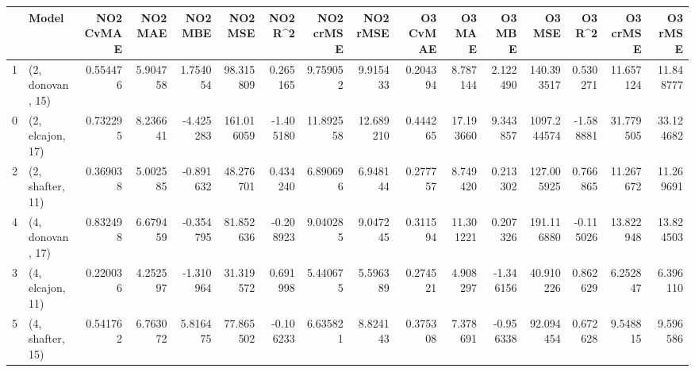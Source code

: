 \begin{tabular}{llrrrrrrrrrrrrrr}
\toprule
{} &             Model &  NO2 CvMAE &   NO2 MAE &   NO2 MBE &     NO2 MSE &   NO2 R\textasciicircum2 &  NO2 crMSE &   NO2 rMSE &  O3 CvMAE &     O3 MAE &    O3 MBE &       O3 MSE &    O3 R\textasciicircum2 &   O3 crMSE &    O3 rMSE \\
\midrule
1 &  (2, donovan, 15) &   0.554476 &  5.904758 &  1.754054 &   98.315809 &  0.265165 &   9.759052 &   9.915433 &  0.204394 &   8.787144 &  2.122490 &   140.393517 &  0.530271 &  11.657124 &  11.848777 \\
0 &  (2, elcajon, 17) &   0.732295 &  8.236641 & -4.425283 &  161.016059 & -1.405180 &  11.892558 &  12.689210 &  0.444265 &  17.193660 &  9.343857 &  1097.244574 & -1.588881 &  31.779505 &  33.124682 \\
2 &  (2, shafter, 11) &   0.369038 &  5.002585 & -0.891632 &   48.276701 &  0.434240 &   6.890696 &   6.948144 &  0.277757 &   8.749420 &  0.213302 &   127.005925 &  0.766865 &  11.267672 &  11.269691 \\
4 &  (4, donovan, 17) &   0.832498 &  6.679459 & -0.354795 &   81.852636 & -0.208923 &   9.040285 &   9.047245 &  0.311594 &  11.301221 &  0.207326 &   191.116880 & -0.115026 &  13.822948 &  13.824503 \\
3 &  (4, elcajon, 11) &   0.220036 &  4.252597 & -1.310964 &   31.319572 &  0.691998 &   5.440675 &   5.596389 &  0.274521 &   4.908297 & -1.346156 &    40.910226 &  0.862629 &   6.252847 &   6.396110 \\
5 &  (4, shafter, 15) &   0.541762 &  6.763072 &  5.816475 &   77.865502 & -0.106233 &   6.635821 &   8.824143 &  0.375308 &   7.378691 & -0.956338 &    92.094454 &  0.672628 &   9.548815 &   9.596586 \\
\bottomrule
\end{tabular}
